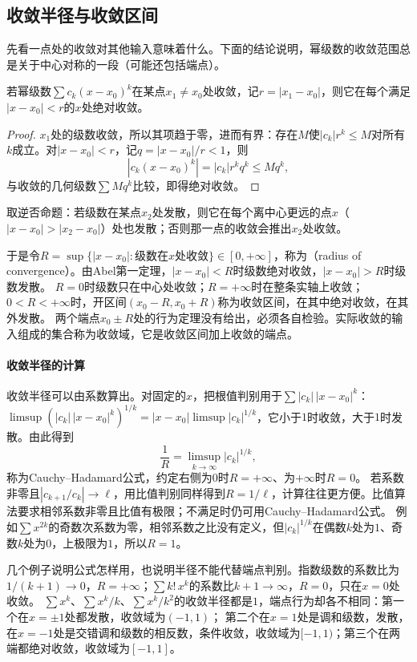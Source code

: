 \subsection{收敛半径与收敛区间}
\label{sec:ru-radius-of-convergence}

先看一点处的收敛对其他输入意味着什么。下面的结论说明，幂级数的收敛范围总是关于中心对称的一段（可能还包括端点）。
\begin{theorem}[Abel第一定理]
\label{thm:ru-abel-lemma}
若幂级数$\sum c_k(x-x_0)^k$在某点$x_1\neq x_0$处收敛，记$r=|x_1-x_0|$，则它在每个满足$|x-x_0|<r$的$x$处绝对收敛。
\end{theorem}
\begin{proof}
$x_1$处的级数收敛，所以其项趋于零，进而有界：存在$M$使$|c_k|r^k\leq M$对所有$k$成立。对$|x-x_0|<r$，记$q=|x-x_0|/r<1$，则
\[
 |c_k(x-x_0)^k|=|c_k|r^kq^k\leq Mq^k,
\]
与收敛的几何级数$\sum Mq^k$比较，即得绝对收敛。
\end{proof}
取逆否命题：若级数在某点$x_2$处发散，则它在每个离中心更远的点$x$（$|x-x_0|>|x_2-x_0|$）处也发散；否则那一点的收敛会推出$x_2$处收敛。

于是令$R=\sup\{|x-x_0|:\text{级数在}x\text{处收敛}\}\in[0,+\infty]$，称为（radius of convergence）。由Abel第一定理，$|x-x_0|<R$时级数绝对收敛，$|x-x_0|>R$时级数发散。
$R=0$时级数只在中心处收敛；$R=+\infty$时在整条实轴上收敛；$0<R<+\infty$时，开区间$(x_0-R,x_0+R)$称为收敛区间，在其中绝对收敛，在其外发散。
两个端点$x_0\pm R$处的行为定理没有给出，必须各自检验。实际收敛的输入组成的集合称为收敛域，它是收敛区间加上收敛的端点。

\paragraph{收敛半径的计算}
收敛半径可以由系数算出。对固定的$x$，把根值判别用于$\sum|c_k|\,|x-x_0|^k$：$\limsup(|c_k|\,|x-x_0|^k)^{1/k}=|x-x_0|\limsup|c_k|^{1/k}$，它小于$1$时收敛，大于$1$时发散。由此得到
\[
 \frac1R=\limsup_{k\to\infty}|c_k|^{1/k},
\]
称为Cauchy--Hadamard公式，约定右侧为$0$时$R=+\infty$、为$+\infty$时$R=0$。
若系数非零且$|c_{k+1}/c_k|\to\ell$，用比值判别同样得到$R=1/\ell$，计算往往更方便。比值算法要求相邻系数非零且比值有极限；不满足时仍可用Cauchy--Hadamard公式。
例如$\sum x^{2k}$的奇数次系数为零，相邻系数之比没有定义，但$|c_k|^{1/k}$在偶数$k$处为$1$、奇数$k$处为$0$，上极限为$1$，所以$R=1$。

几个例子说明公式怎样用，也说明半径不能代替端点判别。指数级数的系数比为$1/(k+1)\to0$，$R=+\infty$；$\sum k!\,x^k$的系数比$k+1\to\infty$，$R=0$，只在$x=0$处收敛。
$\sum x^k$、$\sum x^k/k$、$\sum x^k/k^2$的收敛半径都是$1$，端点行为却各不相同：第一个在$x=\pm1$处都发散，收敛域为$(-1,1)$；
第二个在$x=1$处是调和级数，发散，在$x=-1$处是交错调和级数的相反数，条件收敛，收敛域为$[-1,1)$；第三个在两端都绝对收敛，收敛域为$[-1,1]$。

